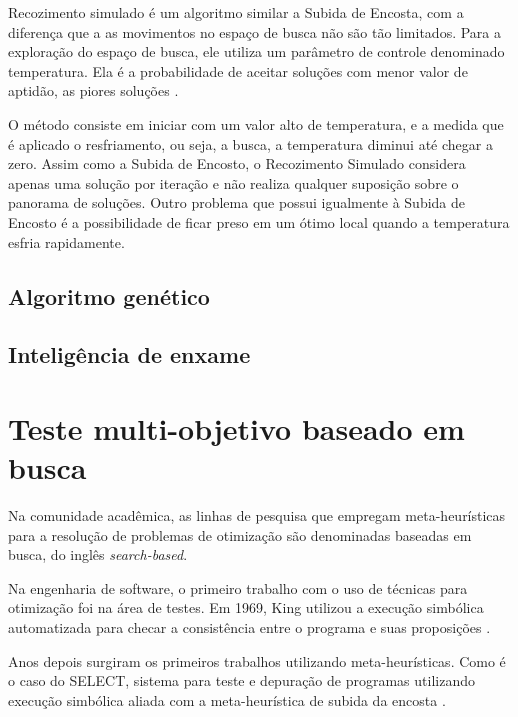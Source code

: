 Recozimento simulado é um algoritmo similar a Subida de Encosta, com a diferença que a as movimentos no espaço de busca não são tão limitados. Para a exploração do espaço de busca, ele utiliza um parâmetro de controle denominado temperatura. Ela é a probabilidade de aceitar soluções com menor valor de aptidão, as piores soluções \cite{kirkpatrick1983optimization}.

O método consiste em iniciar com um valor alto de temperatura, e a medida que é aplicado o resfriamento, ou seja, a busca, a temperatura diminui até chegar a zero. Assim como a Subida de Encosto, o Recozimento Simulado considera apenas uma solução por iteração e não realiza qualquer suposição sobre o panorama de soluções. Outro problema que possui igualmente à Subida de Encosto é a possibilidade de ficar preso em um ótimo local quando a temperatura esfria rapidamente.

\subsection{Algoritmo genético}

\subsection{Inteligência de enxame}


\section{Teste multi-objetivo baseado em busca}

Na comunidade acadêmica, as linhas de pesquisa que empregam meta-heurísticas
para a resolução de problemas de otimização são denominadas baseadas em busca, do inglês \textit{search-based}.

Na engenharia de software, o primeiro trabalho com o uso de técnicas para
otimização foi na área de testes. Em 1969, King utilizou a execução simbólica
automatizada para checar a consistência entre o programa e suas proposições
\cite{king1969program}. 

Anos depois surgiram os primeiros trabalhos utilizando meta-heurísticas. Como é
o caso do SELECT, sistema para teste e depuração de programas utilizando
execução simbólica aliada com a meta-heurística de subida da encosta
\cite{boyer1975select}.


